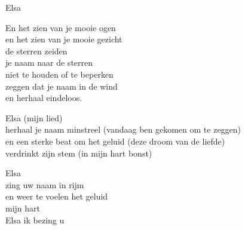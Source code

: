 \begin{song}[tango]{Elsa}
\begin{translation}
En het zien van je mooie ogen\\
en het zien van je mooie gezicht\\
de sterren zeiden\\
je naam naar de sterren\\
niet te houden of te beperken\\
zeggen dat je naam in de wind\\
en herhaal eindeloos.\vspace{\wlskip}

Elsa (mijn lied)\\
herhaal je naam minstreel (vandaag ben gekomen om te zeggen)\\
en een sterke beat om het geluid (deze droom van de liefde)\\
verdrinkt zijn stem (in mijn hart bonst)\vspace{\wlskip}

Elsa\\
zing uw naam in rijm\\
en weer te voelen het geluid\\
mijn hart\\
Elsa ik bezing u
\end{translation}
\end{song}
